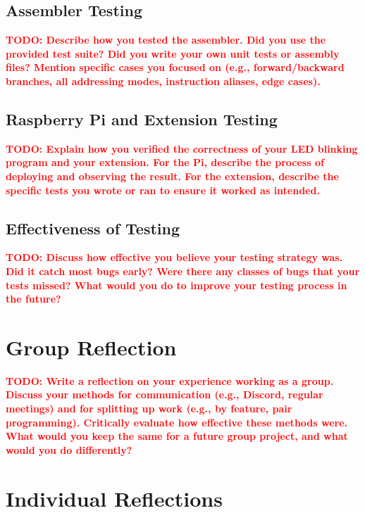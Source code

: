 \documentclass[11pt]{article}
\newcommand{\todo}[1]{\textcolor{red}{\textbf{TODO: #1}}}
\begin{document}
\subsection{Assembler Testing}
\todo{Describe how you tested the assembler. Did you use the provided test suite? Did you write your own unit tests or assembly files? Mention specific cases you focused on (e.g., forward/backward branches, all addressing modes, instruction aliases, edge cases).}

\subsection{Raspberry Pi and Extension Testing}
\todo{Explain how you verified the correctness of your LED blinking program and your extension. For the Pi, describe the process of deploying and observing the result. For the extension, describe the specific tests you wrote or ran to ensure it worked as intended.}

\subsection{Effectiveness of Testing}
\todo{Discuss how effective you believe your testing strategy was. Did it catch most bugs early? Were there any classes of bugs that your tests missed? What would you do to improve your testing process in the future?}


\section{Group Reflection}
\todo{Write a reflection on your experience working as a group. Discuss your methods for communication (e.g., Discord, regular meetings) and for splitting up work (e.g., by feature, pair programming). Critically evaluate how effective these methods were. What would you keep the same for a future group project, and what would you do differently?}


\section{Individual Reflections}
\end{document}
